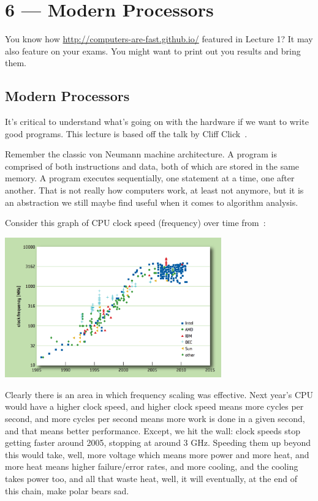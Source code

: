 \documentclass[a4paper]{report}
\begin{document}
\chapter*{6 --- Modern Processors}


You know how \url{http://computers-are-fast.github.io/} featured in Lecture 1? It may also feature on your exams. You might want to print out you results and bring them.

\section*{Modern Processors}

It's critical to understand what's going on with the hardware if we want to write good programs. This lecture is based off the talk by Cliff Click~\cite{modern-hardware}.

Remember the classic von Neumann machine architecture. A program is comprised of both instructions and data, both of which are stored in the same memory. A program executes sequentially, one statement at a time, one after another. That is not really how computers work, at least not anymore, but it is an abstraction we still maybe find useful when it comes to algorithm analysis.

Consider this graph of CPU clock speed (frequency) over time from~\cite{cpudb}:

\begin{center}
\includegraphics[width=0.7\textwidth]{images/cpu-frequency}
\end{center}

Clearly there is an area in which frequency scaling was effective. Next year's CPU would have a higher clock speed, and higher clock speed means more cycles per second, and more cycles per second means more work is done in a given second, and that means better performance. Except, we hit the wall: clock speeds stop getting faster around 2005, stopping at around 3 GHz. Speeding them up beyond this would take, well, more voltage which means more power and more heat, and more heat means higher failure/error rates, and more cooling, and the cooling takes power too, and all that waste heat, well, it will eventually, at the end of this chain, make polar bears sad.
\end{document}
